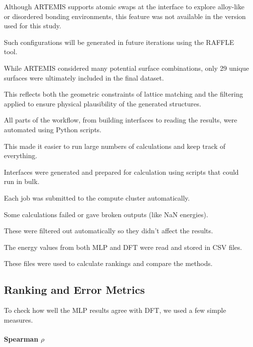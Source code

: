 
Although ARTEMIS supports atomic swaps at the interface to explore alloy-like or disordered bonding environments, this
feature was not available in the version used for this study.

Such configurations will be generated in future iterations using the RAFFLE tool.


While ARTEMIS considered many potential surface combinations, only 29 unique surfaces were ultimately included in the
final dataset.

This reflects both the geometric constraints of lattice matching and the filtering applied to ensure physical
plausibility of the generated structures.


All parts of the workflow, from building interfaces to reading the results, were automated using Python scripts.

This made it easier to run large numbers of calculations and keep track of everything.


Interfaces were generated and prepared for calculation using scripts that could run in bulk.

Each job was submitted to the compute cluster automatically.


Some calculations failed or gave broken outputs (like NaN energies).

These were filtered out automatically so they didn't affect the results.


The energy values from both MLP and DFT were read and stored in CSV files.

These files were used to calculate rankings and compare the methods.


\subsection{Ranking and Error Metrics}


To check how well the MLP results agree with DFT, we used a few simple measures.


\paragraph{Spearman \( \rho \)}

